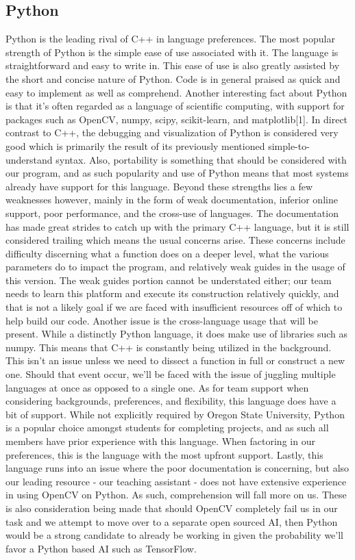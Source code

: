 \documentclass[onecolumn, draftclsnofoot,10pt, compsoc]{IEEEtran}
\begin{document}
\subsection{Python}
Python is the leading rival of C++ in language preferences. The most popular strength of Python is the simple ease of use associated with it. The language is straightforward and easy to write in. This ease of use is also greatly assisted by the short and concise nature of Python. Code is in general praised as quick and easy to implement as well as comprehend. Another interesting fact about Python is that it’s often regarded as a language of scientific computing, with support for packages such as OpenCV, numpy, scipy, scikit-learn, and matplotlib[1]. In direct contrast to C++, the debugging and visualization of Python is considered very good which is primarily the result of its previously mentioned simple-to-understand syntax. Also, portability is something that should be considered with our program, and as such popularity and use of Python means that most systems already have support for this language. Beyond these strengths lies a few weaknesses however, mainly in the form of weak documentation, inferior online support, poor performance, and the cross-use of languages. The documentation has made great strides to catch up with the primary C++ language, but it is still considered trailing which means the usual concerns arise. These concerns include difficulty discerning what a function does on a deeper level, what the various parameters do to impact the program, and relatively weak guides in the usage of this version. The weak guides portion cannot be understated either; our team needs to learn this platform and execute its construction relatively quickly, and that is not a likely goal if we are faced with insufficient resources off of which to help build our code. Another issue is the cross-language usage that will be present. While a distinctly Python language, it does make use of libraries such as numpy. This means that C++ is constantly being utilized in the background. This isn’t an issue unless we need to dissect a function in full or construct a new one. Should that event occur, we’ll be faced with the issue of juggling multiple languages at once as opposed to a single one. As for team support when considering backgrounds, preferences, and flexibility, this language does have a bit of support. While not explicitly required by Oregon State University, Python is a popular choice amongst students for completing projects, and as such all members have prior experience with this language. When factoring in our preferences, this is the language with the most upfront support. Lastly, this language runs into an issue where the poor documentation is concerning, but also our leading resource - our teaching assistant - does not have extensive experience in using OpenCV on Python. As such, comprehension will fall more on us. These is also consideration being made that should OpenCV completely fail us in our task and we attempt to move over to a separate open sourced AI, then Python would be a strong candidate to already be working in given the probability we’ll favor a Python based AI such as TensorFlow.
\end{document}
